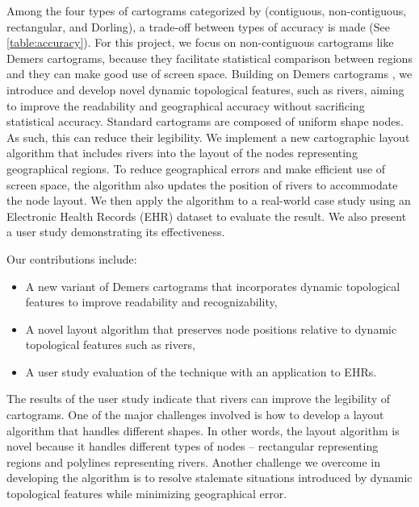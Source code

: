 Among the four types of cartograms categorized by  (contiguous, non-contiguous, rectangular, and Dorling), a trade-off between types of accuracy is made (See \autoref{table:accuracy}). For this project, we focus on non-contiguous cartograms like Demers cartograms, because they facilitate statistical comparison between regions and they can make good use of screen space. Building on Demers cartograms \cite{ian2002Cartogram}, we introduce and develop novel dynamic topological features, such as rivers, aiming to improve the readability and geographical accuracy without sacrificing statistical accuracy. Standard cartograms are composed of uniform shape nodes. As such, this can reduce their legibility. We implement a new cartographic layout algorithm that includes rivers into the layout of the nodes representing geographical regions. To reduce geographical errors and make efficient use of screen space, the algorithm also updates the position of rivers to accommodate the node layout. We then apply the algorithm to a real-world case study using an Electronic Health Records (EHR) dataset to evaluate the result. We also present a user study demonstrating its effectiveness.

Our contributions include:

\begin{itemize}
    \item A new variant of Demers cartograms that incorporates dynamic topological features to improve readability and recognizability,
    \item A novel layout algorithm that preserves node positions relative to dynamic topological features such as rivers,
    \item A user study evaluation of the technique with an application to EHRs.
\end{itemize}

The results of the user study indicate that rivers can improve the legibility of cartograms. One of the major challenges involved is how to develop a layout algorithm that handles different shapes. In other words, the layout algorithm is novel because it handles different types of nodes -- rectangular representing regions and polylines representing rivers. Another challenge we overcome in developing the algorithm is to resolve stalemate situations introduced by dynamic topological features while minimizing geographical error.